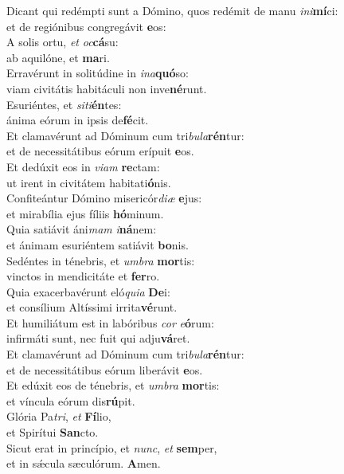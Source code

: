 \evenverse Dicant qui redémpti sunt a Dómino, quos redémit de manu \textit{i}\textit{ni}\textbf{mí}ci:~\*\\
\evenverse et de regiónibus congregávit \textbf{e}os:\\
\oddverse A solis ortu, \textit{et} \textit{oc}\textbf{cá}su:~\*\\
\oddverse ab aquilóne, et \textbf{ma}ri.\\
\evenverse Erravérunt in solitúdine in \textit{i}\textit{na}\textbf{quó}so:~\*\\
\evenverse viam civitátis habitáculi non inve\textbf{né}runt.\\
\oddverse Esuriéntes, et \textit{si}\textit{ti}\textbf{én}tes:~\*\\
\oddverse ánima eórum in ipsis de\textbf{fé}cit.\\
\evenverse Et clamavérunt ad Dóminum cum tri\textit{bu}\textit{la}\textbf{rén}tur:~\*\\
\evenverse et de necessitátibus eórum erípuit \textbf{e}os.\\
\oddverse Et dedúxit eos in \textit{vi}\textit{am} \textbf{re}ctam:~\*\\
\oddverse ut irent in civitátem habitati\textbf{ó}nis.\\
\evenverse Confiteántur Dómino misericór\textit{di}\textit{æ} \textbf{e}jus:~\*\\
\evenverse et mirabília ejus fíliis \textbf{hó}minum.\\
\oddverse Quia satiávit áni\textit{mam} \textit{i}\textbf{ná}nem:~\*\\
\oddverse et ánimam esuriéntem satiávit \textbf{bo}nis.\\
\evenverse Sedéntes in ténebris, et \textit{um}\textit{bra} \textbf{mor}tis:~\*\\
\evenverse vinctos in mendicitáte et \textbf{fer}ro.\\
\oddverse Quia exacerbavérunt eló\textit{qui}\textit{a} \textbf{De}i:~\*\\
\oddverse et consílium Altíssimi irrita\textbf{vé}runt.\\
\evenverse Et humiliátum est in labóribus \textit{cor} \textit{e}\textbf{ó}rum:~\*\\
\evenverse infirmáti sunt, nec fuit qui adju\textbf{vá}ret.\\
\oddverse Et clamavérunt ad Dóminum cum tri\textit{bu}\textit{la}\textbf{rén}tur:~\*\\
\oddverse et de necessitátibus eórum liberávit \textbf{e}os.\\
\evenverse Et edúxit eos de ténebris, et \textit{um}\textit{bra} \textbf{mor}tis:~\*\\
\evenverse et víncula eórum dis\textbf{rú}pit.\\
\oddverse Glória Pa\textit{tri}, \textit{et} \textbf{Fí}lio,~\*\\
\oddverse et Spirítui \textbf{San}cto.\\
\evenverse Sicut erat in princípio, et \textit{nunc}, \textit{et} \textbf{sem}per,~\*\\
\evenverse et in sǽcula sæculórum. \textbf{A}men.\\
